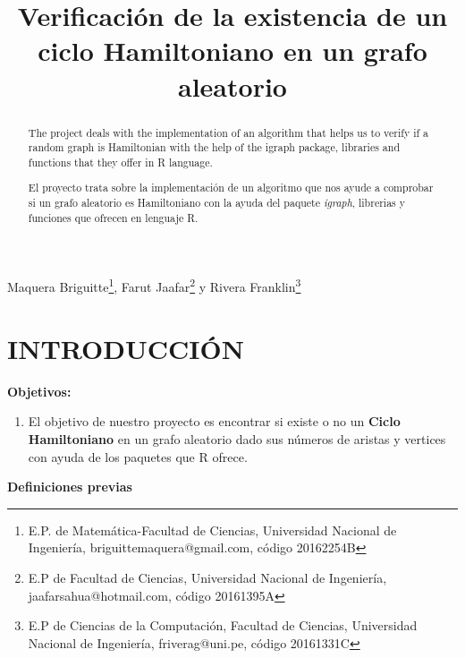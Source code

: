 \documentclass[journal]{IEEEtran}
\title{\LARGE \bf
		Verificación de la existencia de un ciclo Hamiltoniano en un grafo aleatorio}
\begin{document}
\maketitle
{Maquera Briguitte\footnote{E.P. de Matemática-Facultad de Ciencias, 	Universidad Nacional de Ingeniería, briguittemaquera@gmail.com, código 20162254B}, Farut Jaafar\footnote{E.P de Facultad de Ciencias, 	Universidad Nacional de Ingeniería, jaafarsahua@hotmail.com, código 	20161395A} y Rivera Franklin\footnote{E.P de Ciencias de la Computación, Facultad de Ciencias, Universidad Nacional de Ingeniería, friverag@uni.pe, código 20161331C}}
\vspace{10mm}
\thispagestyle{empty}

\pagestyle{empty}


\begin{abstract}
	
	The project deals with the implementation of an algorithm that helps us to verify if a random graph is Hamiltonian with the help of the igraph package, libraries and functions that they offer in R language.
\end{abstract}

\begin{abstract}
	
	El proyecto trata sobre la implementación de un algoritmo que nos ayude a comprobar si un grafo aleatorio es Hamiltoniano  con la ayuda del paquete \textit{igraph}, librerias y funciones que ofrecen en lenguaje R. 

\end{abstract}

	
\section{\large\bf INTRODUCCI{\'O}N}
 
 {\bf Objetivos:}\\
 \begin{enumerate}
 	\item El objetivo de nuestro proyecto es encontrar si existe o no un {\bf Ciclo Hamiltoniano} en un grafo aleatorio dado sus números de aristas y vertices con ayuda de los paquetes que R ofrece.
 	
 \end{enumerate}
\vspace{0.2mm}
{\bf Definiciones previas}\\
\vspace{0.2mm}
\end{document}
